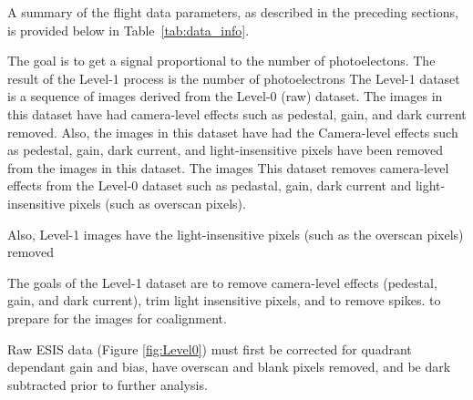   
    
    	
    	
    	A summary of the flight data parameters, as described in the preceding sections, is provided below in Table~\ref{tab:data_info}. 
    	
        The goal is to get a signal proportional to the number of photoelectons. 
        The result of the Level-1 process is the number of photoelectrons 
        The Level-1 dataset is a sequence of images derived from the Level-0 (raw) dataset.
        The images in this dataset have had camera-level effects such as pedestal, gain, and dark current removed.
        Also, the images in this dataset have had the 
        Camera-level effects such as pedestal, gain, dark current, and light-insensitive pixels have been removed from the images in this dataset.
        The images 
        This dataset removes camera-level effects from the Level-0 dataset such as pedastal, gain, dark current and light-insensitive pixels (such as overscan pixels).
        
        
        Also, Level-1 images have the light-insensitive pixels (such as the overscan pixels) removed 
    
        The goals of the Level-1 dataset are to remove camera-level effects (pedestal, gain, and dark current), trim light insensitive pixels, and to remove spikes. to prepare for the images for coalignment.
    
       Raw ESIS data (Figure \ref{fig:Level0}) must first be corrected for quadrant dependant gain and bias, have overscan and blank pixels removed, and be dark subtracted prior to further analysis.
       
	       


